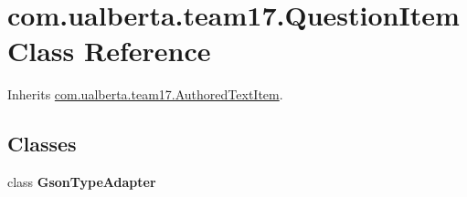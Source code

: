 \hypertarget{classcom_1_1ualberta_1_1team17_1_1_question_item}{\section{com.\+ualberta.\+team17.\+Question\+Item Class Reference}
\label{classcom_1_1ualberta_1_1team17_1_1_question_item}
}


Inherits \hyperlink{classcom_1_1ualberta_1_1team17_1_1_authored_text_item}{com.\+ualberta.\+team17.\+Authored\+Text\+Item}.

\subsection*{Classes}
\begin{DoxyCompactItemize}
\item 
class {\bfseries Gson\+Type\+Adapter}
\end{DoxyCompactItemize}
